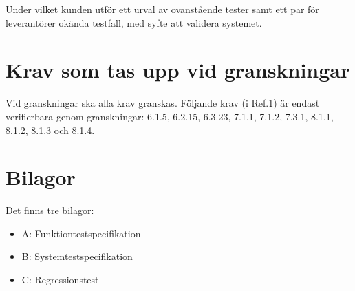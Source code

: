 \documentclass[a4paper]{article}
\begin{document}
Under vilket kunden utför ett urval av ovanstående tester samt ett par för leverantörer okända testfall, med syfte att validera systemet.

\section{Krav som tas upp vid granskningar}


Vid granskningar ska alla krav granskas.
Följande krav (i Ref.1) är endast verifierbara genom granskningar: 6.1.5, 6.2.15, 6.3.23, 7.1.1, 7.1.2, 7.3.1, 8.1.1, 8.1.2, 8.1.3 och 8.1.4.

\section{Bilagor}

Det finns tre bilagor:

\begin{itemize}
\item A: Funktiontestspecifikation
\item B: Systemtestspecifikation
\item C: Regressionstest

\end{itemize}

\newpage
\end{document}
